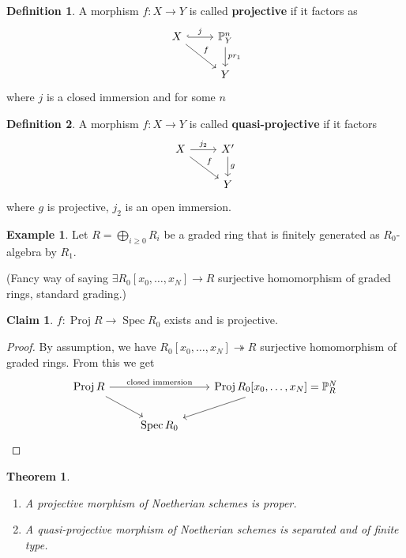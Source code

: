 \documentclass[12pt]{article}
\DeclareMathOperator{\Spec}{Spec}
\DeclareMathOperator{\Proj}{Proj}
\newtheorem*{theorem}{Theorem}
\theoremstyle{definition}
\newtheorem*{definition}{Definition}
\newtheorem*{claim}{Claim}
\newtheorem*{example}{Example}
\theoremstyle{remark}
\begin{document}
\begin{definition}
A morphism $f:X\rightarrow Y$ is called \textbf{projective} if it factors as
\[
\begin{tikzcd}
X\arrow[r,hook,"j"]\arrow[rd,"f"]&\mathbb{P}_Y^n\arrow[d,"pr_1"]\\
&Y
\end{tikzcd}
\]
where $j$ is a closed immersion and for some $n$
\end{definition}

\begin{definition}
A morphism $f:X\rightarrow Y$ is called \textbf{quasi-projective} if it factors
\[
\begin{tikzcd}
X\arrow[r,"j_2"]\arrow[rd,"f"]&X'\arrow[d,"g"]\\
&Y
\end{tikzcd}
\]
where $g$ is projective, $j_2$ is an open immersion.
\end{definition}

\begin{example}
Let $R=\bigoplus_{i\geq0}R_i$ be a graded ring that is finitely generated as $R_0$-algebra by $R_1$.

(Fancy way of saying $\exists R_0[x_0,\ldots,x_N]\rightarrow R$ surjective homomorphism of graded rings, standard grading.)

\begin{claim}
$f:\Proj R\rightarrow\Spec R_0$ exists and is projective.
\end{claim}

\begin{proof}
By assumption, we have $R_0[x_0,\ldots,x_N]\twoheadrightarrow R$ surjective homomorphism of graded rings. From this we get
\[
\begin{tikzcd}
\Proj R\arrow[rr,"\text{closed immersion}"]\arrow[rd]&&\Proj R_0[x_0,\ldots,x_N]=\mathbb{P}_R^N\arrow[ld]\\
&\Spec R_0
\end{tikzcd}
\]
\end{proof}
\end{example}

\begin{theorem}
\begin{enumerate}[label=\arabic*)]
\item A projective morphism of Noetherian schemes is proper.

\item A quasi-projective morphism of Noetherian schemes is separated and of finite type.
\end{enumerate}
\end{theorem}
\end{document}
